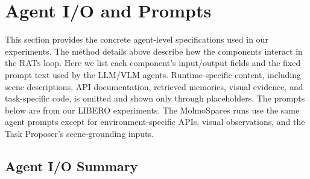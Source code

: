\documentclass{llmxive}
\providecommand{\PromptParagraph}[1]{\paragraph{#1}\mbox{}\par\nobreak\vspace{0.2\baselineskip}\noindent}
\begin{document}
\providecommand{\PromptParagraph}[1]{\paragraph{#1}\mbox{}\par\nobreak\vspace{0.2\baselineskip}\noindent}

\section{Agent I/O and Prompts}
This section provides the concrete agent-level specifications used in our
experiments. The method details above describe how the components interact in
the \textsc{RATs} loop. Here we list each component's input/output fields and
the fixed prompt text used by the LLM/VLM agents. Runtime-specific content,
including scene descriptions, API documentation, retrieved memories, visual
evidence, and task-specific code, is omitted and shown only through
placeholders. The prompts below are from our LIBERO experiments. The
MolmoSpaces runs use the same agent prompts except for environment-specific
APIs, visual observations, and the Task Proposer's scene-grounding inputs.
\subsection{Agent I/O Summary}
\label{sec:appendix_prompt_contracts}
\end{document}
